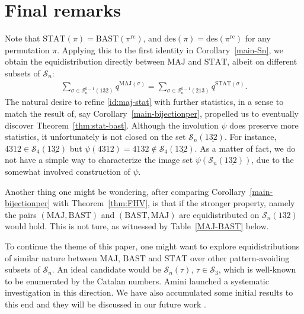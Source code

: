 \documentclass[12pt]{amsart}
\numberwithin{equation}{section}
\theoremstyle{plain}
\theoremstyle{definition}
\def\MAJ{\mathrm{MAJ}}
\def\STAT{\mathrm{STAT}}
\def\BAST{\mathrm{BAST}}
\def\des{\mathrm{des}}
\def\rc{\mathrm{rc}}
\def\SS{\mathcal{S}}
\begin{document}
\section{Final remarks}\label{sec:conclusion}
Note that $\STAT(\pi)=\BAST(\pi^{\rc})$, and $\des(\pi)=\des(\pi^{\rc})$ for any permutation $\pi$. Applying this to the first identity in Corollary~\ref{main-Sn}, we obtain the equidistribution directly between $\MAJ$ and $\STAT$, albeit on different subsets of $\SS_n$:
\begin{align}\label{id:maj-stat}
\sum\limits_{\sigma \in \SS_n^{k-1}(1\underline{32})}
    q^{\MAJ(\sigma)}
=
\sum\limits_{\sigma \in \SS_n^{k-1}(\underline{21}3)}
    q^{\STAT(\sigma)}.
\end{align}
The natural desire to refine \eqref{id:maj-stat} with further statistics, in a sense to match the result of, say Corollary~\ref{main-bijectionper}, propelled us to eventually discover Theorem~\ref{thm:stat-bast}. Although the involution $\psi$ does preserve more statistics, it unfortunately is not closed on the set $\SS_n(1\underline{32})$. For instance, $4312\in\SS_4(1\underline{32})$ but $\psi(4312)=4132\not\in\SS_4(1\underline{32})$. As a matter of fact, we do not have a simple way to characterize the image set $\psi(\SS_n(1\underline{32}))$, due to the somewhat involved construction of $\psi$.

Another thing one might be wondering, after comparing Corollary~\ref{main-bijectionper} with Theorem~\ref{thm:FHV}, is that if the stronger property, namely the pairs $(\MAJ,\BAST)$ and $(\BAST,\MAJ)$ are equidistributed on $\SS_n(1\underline{32})$ would hold. This is not ture, as witnessed by Table~\ref{MAJ-BAST} below.

To continue the theme of this paper, one might want to explore equidistributions of similar nature between $\MAJ$, $\BAST$ and $\STAT$ over other pattern-avoiding subsets of $\SS_n$. An ideal candidate would be $\SS_n(\tau)$, $\tau\in\SS_3$, which is well-known to be enumerated by the Catalan numbers. Amini \cite{Am} launched a systematic investigation in this direction. We have also accumulated some initial results to this end and they will be discussed in our future work \cite{CF}.
\end{document}
